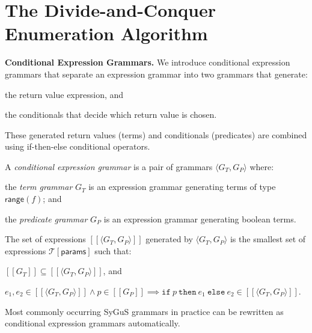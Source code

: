\documentclass{llncs}
\newcommand\tuple[1]{\langle #1 \rangle}
\newcommand\Expr{e}
\newcommand\Pred{p}
\newcommand\Grammar{G}
\newcommand\sem[1]{[\![ #1 ]\!]}
\newcommand\SynthFun{f}
\newcommand\range{\mathsf{range}}
\newcommand\FormalParameters{\mathsf{params}}
\newcommand\Theory{\mathcal{T}}
\newcommand\ITE[3]{\mathtt{if}~#1~\mathtt{then}~#2~\mathtt{else}~#3}
\newcommand{\sygus}{{\sffamily\fontsize{8.5}{10}\selectfont
    SyGuS}\xspace}
\renewcommand{\paragraph}[1]{\par\noindent\textbf{#1.}}
\begin{document}
\section{The Divide-and-Conquer Enumeration Algorithm}
\label{sec:algo}


\paragraph{Conditional Expression Grammars}
We introduce conditional expression grammars that separate an
expression grammar into two grammars that generate:
\begin{inparaenum}[(a)]
\item the return value expression, and
\item the conditionals that decide which return value is chosen.
\end{inparaenum}
These generated return values (terms) and conditionals (predicates) are
combined using if-then-else conditional operators.

A {\em conditional expression grammar} is a pair of grammars $\tuple{
\Grammar_T, \Grammar_P }$ where:
\begin{inparaenum}[(a)]
\item the {\em term grammar} $\Grammar_T$ is an expression grammar
  generating terms of type $\range(\SynthFun)$; and
\item the {\em predicate grammar} $\Grammar_P$ is an expression
  grammar generating boolean terms.
\end{inparaenum}
The set of expressions $\sem{\tuple{ \Grammar_T, \Grammar_P }}$
generated by $\tuple{ G_T, G_P }$ is the smallest set of expressions
$\Theory[\FormalParameters]$ such that:
\begin{inparaenum}[(a)]
\item $\sem{\Grammar_T} \subseteq \sem{\tuple{ \Grammar_T, \Grammar_P
  }}$, and
\item $\Expr_1, \Expr_2 \in \sem{\tuple{ \Grammar_T, \Grammar_P }}
  \wedge \Pred \in \sem{\Grammar_P} \implies
  \ITE{\Pred}{\Expr_1}{\Expr_2} \in \sem{\tuple{ \Grammar_T, \Grammar_P
  }}$.
\end{inparaenum}
Most commonly occurring \sygus grammars in practice can be rewritten
as conditional expression grammars automatically.
\end{document}
